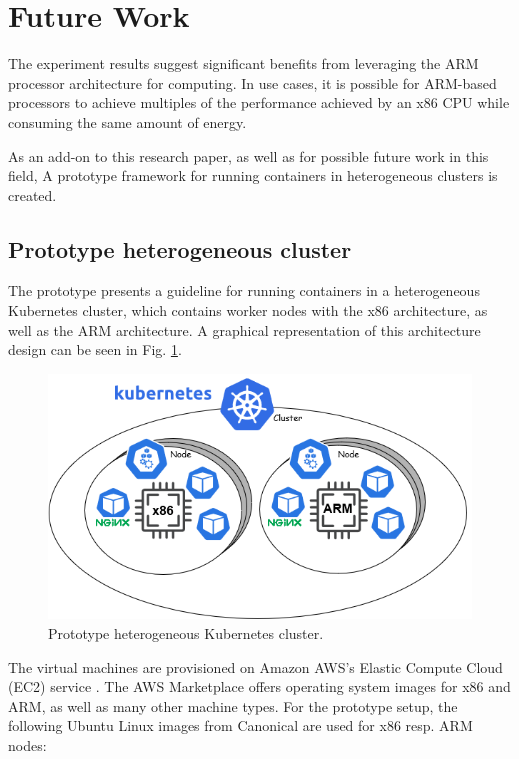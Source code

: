 \section{Future Work}
The experiment results suggest
significant benefits from leveraging
the ARM processor architecture for computing.
In use cases, it is possible for ARM-based processors to achieve multiples of the performance achieved by an x86 CPU 
while consuming the same amount of energy.

As an add-on to this research paper,
as well as for possible future work in
this field,
A prototype framework
for running containers in heterogeneous clusters is created.


\subsection{Prototype heterogeneous cluster}

The prototype presents a guideline for running containers in a heterogeneous Kubernetes 
\cite{kubernetesIo} cluster,
which contains worker nodes with the x86 architecture, as well as the ARM architecture.
A graphical representation of this architecture design can be seen in Fig. 
\ref{fig:prototypeKubeCluster}.

\begin{figure}[h]
    \centering
    \includegraphics[width=.95\linewidth]{fig/experiment_k8s_cluster_x86_arm_v1.png}
    \caption{Prototype heterogeneous Kubernetes cluster.}
    \label{fig:prototypeKubeCluster}
\end{figure}

The virtual machines are provisioned on Amazon AWS's Elastic Compute Cloud (EC2) service 
\cite{ec2AmazonAwsWebsite}.
The AWS Marketplace 
\cite{marketplaceAmazonAwsWebsite}
offers operating system images for x86 and ARM, as well as many other machine types. 
For the prototype setup, the following Ubuntu Linux images from 
Canonical
\cite{canonicalMarketplaceAmazonAwsWebsite}
are used for x86 resp. ARM nodes:

